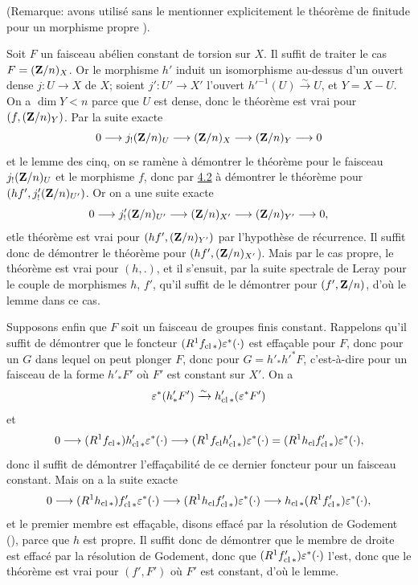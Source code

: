 \documentclass[10pt]{../fichiers-configuration-latex/smfart}
\begin{document}
\noindent
(Remarque:  avons utilisé sans le mentionner explicitement le
théorème de finitude pour un morphisme propre ).

Soit $F$ un faisceau abélien constant de torsion sur $X$. Il suffit de
traiter le cas $F=(\mathbf{Z}/n)_X$. Or le morphisme $h'$ induit un
isomorphisme au-dessus d'un ouvert dense $j:U\rightarrow X$ de $X$;
soient $j':U'\rightarrow X'$ l'ouvert
${h'}^{-1}(U)\xrightarrow{\sim}U$, et $Y=X-U$. On a $\dim Y<n$ parce
que $U$ est dense, donc le théorème est vrai pour
$(f,(\mathbf{Z}/n)_Y)$. Par la suite exacte
$$
0\longrightarrow j_{!}(\mathbf{Z}/n)_U\longrightarrow
(\mathbf{Z}/n)_X\longrightarrow (\mathbf{Z}/n)_Y\longrightarrow 0
$$
et le lemme des cinq, on se ramène à démontrer le théorème pour le
faisceau $j_{!}(\mathbf{Z}/n)_U$ et le morphisme $f$, donc par \hyperref[XVI.lem4.2]{4.2} à
démontrer le théorème pour $(hf', {j'_!}(\mathbf{Z}/n)_{U'})$. Or on
a une suite exacte
$$
0\longrightarrow {j'_!}(\mathbf{Z}/n)_{U'}\longrightarrow
(\mathbf{Z}/n)_{X'}\longrightarrow (\mathbf{Z}/n)_{Y'}\longrightarrow
0{},
$$
et\pageoriginale le théorème est vrai pour $(hf',(\mathbf{Z}/n)_{Y'})$
par l'hypothèse de récurrence. Il suffit donc de démontrer le théorème
pour $(hf',(\mathbf{Z}/n)_{X'}$). Mais par le cas propre, le théorème
est vrai pour $(h,.)$, et il s'ensuit, par la suite spectrale de Leray
pour le couple de morphismes $h$, $f'$, qu'il suffit de le démontrer
pour $(f',\mathbf{Z}/n)$, d'où le lemme dans ce cas.

Supposons enfin que $F$ soit un faisceau de groupes finis
constant. Rappelons qu'il suffit de démontrer que le foncteur
$(R^{1}f_{\operatorname{cl} \ast})\varepsilon^{\ast}(\cdot)$ est effaçable pour $F$,
donc pour un $G$ dans lequel on peut plonger $F$, donc pour
$G={h'_\ast}{h'}^{\ast}F$, c'est-à-dire pour un faisceau de la forme
${h'_\ast}F'$ où $F'$ est constant sur $X'$. On a
$$
\varepsilon^{\ast}({h'_\ast}F')\xrightarrow{\sim}h'_{\operatorname{cl} \ast}(\varepsilon^{\ast}F')
$$
et
$$
0\longrightarrow
(R^{1}f_{\operatorname{cl}\ast})h'_{\operatorname{cl}\ast}\varepsilon^{\ast}(\cdot)\longrightarrow
(R^{1}f_{\operatorname{cl}}h'_{\operatorname{cl}\ast})\varepsilon^{\ast}(\cdot)=(R^{1}h_{\operatorname{cl}}f'_{\operatorname{cl}\ast})\varepsilon^{\ast}(\cdot){},
$$
donc il suffit de démontrer l'effaçabilité de ce dernier foncteur
pour un faisceau constant. Mais on a la suite exacte
$$
0\longrightarrow (R^{1}h_{\operatorname{cl} \ast})f'_{\operatorname{cl}
\ast}\varepsilon^{\ast}(\cdot)\longrightarrow (R^{1}h_{\operatorname{cl}}f'_{\operatorname{cl}
\ast})\varepsilon^{\ast}(\cdot)\longrightarrow
h_{\operatorname{cl}\ast}(R^{1}f'_{\operatorname{cl}\ast})\varepsilon^{\ast}(\cdot){},
$$
et le premier membre est effaçable, disons effacé par la résolution
de Godement (), parce que $h$ est propre. Il suffit donc de
démontrer que le membre de droite est effacé par la résolution de
Godement, donc que $(R^{1}f'_{\operatorname{cl}\ast})\varepsilon^{\ast}(\cdot)$ l'est,
donc que le théorème est vrai pour $(f',F')$ où $F'$ est constant,
d'où le lemme.
\end{document}
